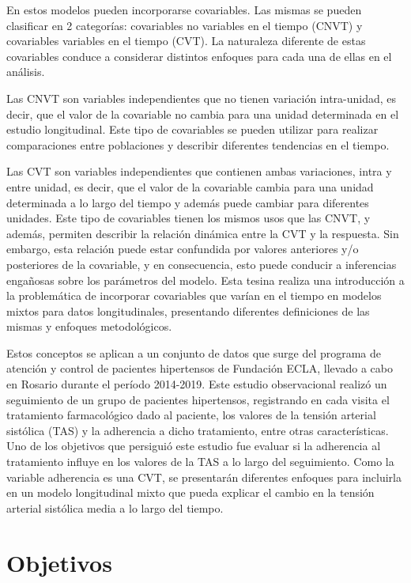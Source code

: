 \documentclass[spanish]{article}
\numberwithin{figure}{subsection}
\numberwithin{equation}{subsection}
\numberwithin{table}{subsection}
\begin{document}
En estos modelos pueden incorporarse covariables. Las mismas se pueden
clasificar en 2 categorías: covariables no variables en el tiempo (CNVT) y
covariables variables en el tiempo (CVT). La naturaleza diferente de estas
covariables conduce a considerar distintos enfoques para cada una de ellas en el
análisis.

Las CNVT son variables independientes que no tienen variación intra-unidad, es
decir, que el valor de la covariable no cambia para una unidad determinada en
el estudio longitudinal. Este tipo de covariables se pueden utilizar para
realizar comparaciones entre poblaciones y describir diferentes tendencias en el
tiempo.

Las CVT son variables independientes que contienen ambas variaciones, intra y
entre unidad, es decir, que el valor de la covariable cambia para una unidad
determinada a lo largo del tiempo y además puede cambiar para diferentes
unidades. Este tipo de covariables tienen los mismos usos que las CNVT, y
además, permiten describir la relación dinámica entre la CVT y la respuesta. Sin
embargo, esta relación puede estar confundida por valores anteriores y/o
posteriores de la covariable, y en consecuencia, esto puede conducir a
inferencias engañosas sobre los parámetros del modelo. Esta tesina realiza una
introducción a la problemática de incorporar covariables que varían en el tiempo
en modelos mixtos para datos longitudinales, presentando diferentes definiciones
de las mismas y enfoques metodológicos.

Estos conceptos se aplican a un conjunto de datos que surge del programa de
atención y control de pacientes hipertensos de Fundación ECLA, llevado a cabo en
Rosario durante el período 2014-2019. Este estudio observacional realizó un
seguimiento de un grupo de pacientes hipertensos, registrando en cada visita el
tratamiento farmacológico dado al paciente, los valores de la tensión arterial
sistólica (TAS) y la adherencia a dicho tratamiento, entre otras
características. Uno de los objetivos que persiguió este estudio fue evaluar si
la adherencia al tratamiento influye en los valores de la TAS a lo largo del
seguimiento. Como la variable adherencia es una CVT, se presentarán diferentes
enfoques para incluirla en un modelo longitudinal mixto que pueda explicar el
cambio en la tensión arterial sistólica media a lo largo del tiempo.

\newpage
\section{Objetivos}
\end{document}

